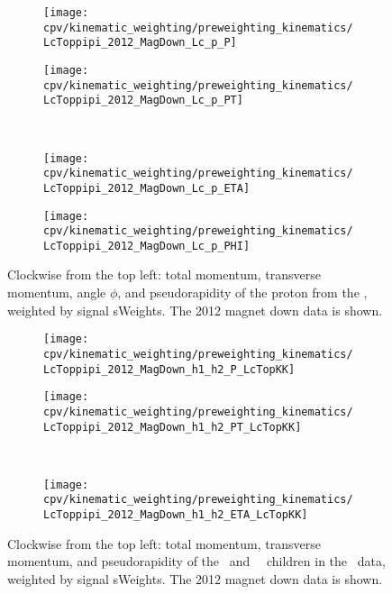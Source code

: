 \begin{figure}
  \begin{subfigure}[b]{0.4\textwidth}
    \texttt{[image: cpv/kinematic\_weighting/preweighting\_kinematics/LcToppipi\_2012\_MagDown\_Lc\_p\_P]}
    \label{fig:cpv:kinematic_weighting:pre:Lc_p:P}
  \end{subfigure}
  \begin{subfigure}[b]{0.4\textwidth}
    \texttt{[image: cpv/kinematic\_weighting/preweighting\_kinematics/LcToppipi\_2012\_MagDown\_Lc\_p\_PT]}
    \label{fig:cpv:kinematic_weighting:pre:Lc_p:PT}
  \end{subfigure}\\
  \begin{subfigure}[b]{0.4\textwidth}
    \texttt{[image: cpv/kinematic\_weighting/preweighting\_kinematics/LcToppipi\_2012\_MagDown\_Lc\_p\_ETA]}
    \label{fig:cpv:kinematic_weighting:pre:Lc_p:ETA}
  \end{subfigure}
  \begin{subfigure}[b]{0.4\textwidth}
    \texttt{[image: cpv/kinematic\_weighting/preweighting\_kinematics/LcToppipi\_2012\_MagDown\_Lc\_p\_PHI]}
    \label{fig:cpv:kinematic_weighting:pre:Lc_p:PHI}
  \end{subfigure}
  \caption{%
    Clockwise from the top left: total momentum, transverse momentum, angle 
    $\phi$, and pseudorapidity of the proton from the \PLambdac, weighted by 
    signal sWeights.
    The 2012 magnet down data is shown.
  }
  \label{fig:cpv:kinematic_weighting:pre:Lc_p}
\end{figure}

\begin{figure}
  \begin{subfigure}[b]{0.5\textwidth}
    \centering
    \texttt{[image: cpv/kinematic\_weighting/preweighting\_kinematics/LcToppipi\_2012\_MagDown\_h1\_h2\_P\_LcTopKK]}
    \label{fig:cpv:kinematic_weighting:pre:pKK_h1h2:P}
  \end{subfigure}
  \begin{subfigure}[b]{0.5\textwidth}
    \centering
    \texttt{[image: cpv/kinematic\_weighting/preweighting\_kinematics/LcToppipi\_2012\_MagDown\_h1\_h2\_PT\_LcTopKK]}
    \label{fig:cpv:kinematic_weighting:pre:pKK_h1h2:PT}
  \end{subfigure}\\
  \begin{subfigure}[b]{\textwidth}
    \centering
    \texttt{[image: cpv/kinematic\_weighting/preweighting\_kinematics/LcToppipi\_2012\_MagDown\_h1\_h2\_ETA\_LcTopKK]}
    \label{fig:cpv:kinematic_weighting:pre:pKK_h1h2:ETA}
  \end{subfigure}
  \caption{%
    Clockwise from the top left: total momentum, transverse momentum, and 
    pseudorapidity of the \PKminus\ and \PKplus\ \PLambdac\ children in the 
    \pKK\ data, weighted by signal sWeights.
    The 2012 magnet down data is shown.
  }
  \label{fig:cpv:kinematic_weighting:pre:pKK_h1h2}
\end{figure}

